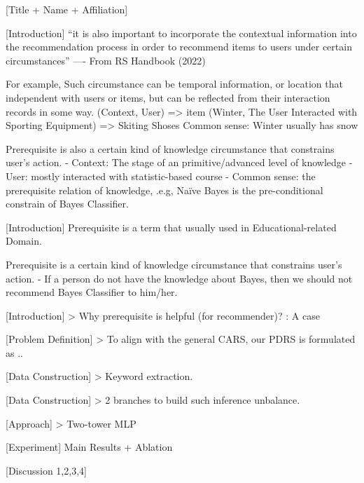 [Title + Name + Affiliation]


[Introduction]
“it is also important to incorporate the contextual information into the recommendation process in order to recommend items to users under certain circumstances”
				---- From RS Handbook (2022)

For example,
Such circumstance can be temporal information, or location that independent with users or items, but can be reflected from their interaction records in some way.
(Context, User) => item
(Winter, The User Interacted with Sporting Equipment) => Skiting Shoses
Common sense: Winter usually has snow

Prerequisite is also a certain kind of knowledge circumstance that constrains user’s action.
- Context: The stage of an primitive/advanced level of knowledge
- User: mostly interacted with statistic-based course
- Common sense: the prerequisite relation of knowledge, .e.g, Naïve Bayes is the pre-conditional constrain of Bayes Classifier.

[Introduction]
Prerequisite is a term that usually used in Educational-related Domain.

Prerequisite is a certain kind of knowledge circumstance that constrains user’s action.
- If a person do not have the knowledge about Bayes, then we should not recommend Bayes Classifier to him/her.


[Introduction]
> Why prerequisite is helpful (for recommender)?
    : A case

[Problem Definition]
> To align with the general CARS, our PDRS is formulated as ..


[Data Construction]
> Keyword extraction.


[Data Construction]
> 2 branches to build such inference unbalance.


[Approach]
> Two-tower MLP


[Experiment]
Main Results + Ablation


[Discussion 1,2,3,4]

